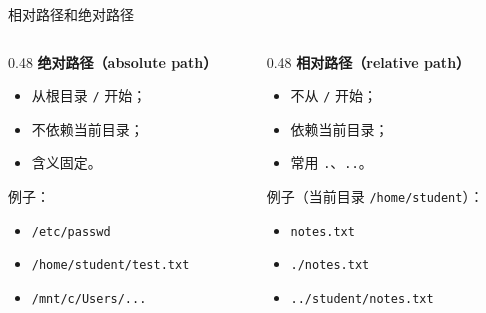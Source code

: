 \documentclass[aspectratio=169]{beamer}
\begin{document}
\begin{frame}{相对路径和绝对路径}
\begin{columns}[T]
\begin{column}{0.48\textwidth}
\textbf{绝对路径（absolute path）}
\begin{itemize}
  \item 从根目录 \texttt{/} 开始；
  \item 不依赖当前目录；
  \item 含义固定。
\end{itemize}

例子：
\begin{itemize}
  \item \texttt{/etc/passwd}
  \item \texttt{/home/student/test.txt}
  \item \texttt{/mnt/c/Users/...}
\end{itemize}
\end{column}

\begin{column}{0.48\textwidth}
\textbf{相对路径（relative path）}
\begin{itemize}
  \item 不从 \texttt{/} 开始；
  \item 依赖当前目录；
  \item 常用 \texttt{.}、\texttt{..}。
\end{itemize}

例子（当前目录 \texttt{/home/student}）：
\begin{itemize}
  \item \texttt{notes.txt}
  \item \texttt{./notes.txt}
  \item \texttt{../student/notes.txt}
\end{itemize}
\end{column}
\end{columns}
\end{frame}
\end{document}
